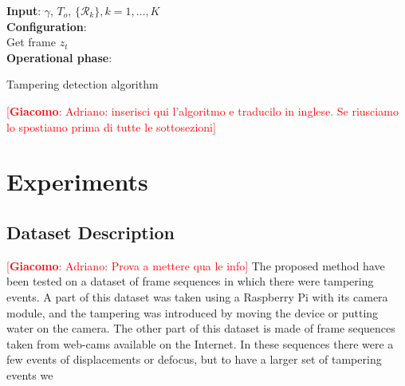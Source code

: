 \documentclass{llncs}
\newcommand{\gi}[1]{{\textcolor{red}{[\small \textbf{Giacomo}: #1]}}}
\begin{document}
\begin{algorithm}[tp]
	\LinesNumbered
	\textbf{Input}: $\gamma$, $T_{o}$, $\{\mathcal{R}_k\}, k=1,\dots,K$ \\
	\textbf{Configuration}:\\
	 
	{	 Get frame $z_t$ \\
		 
	}
	 
	\textbf{Operational phase}:\\
	    
	\caption{Tampering detection algorithm}
	\label{alg:DISPL}
\end{algorithm}
\gi{Adriano: inserisci qui l'algoritmo e traducilo in inglese. Se riusciamo lo spostiamo prima di tutte le sottosezioni}

\section{Experiments}\label{sec:experiments}

\subsection{Dataset Description}\label{subsec:Dataset}
\gi{Adriano: Prova a mettere qua le info}
The proposed method have been tested on a dataset of frame sequences in which there were tampering events.
A part of this dataset was taken using a Raspberry Pi with its camera module, and the tampering was introduced by moving the device or putting water on the camera.
The other part of this dataset is made of frame sequences taken from web-cams available on the Internet. 
In these sequences there were a few events of displacements or defocus, but to have a larger set of tampering events we
\end{document}
